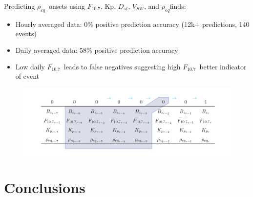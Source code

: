 \documentclass[xcolor={dvipsnames,table}]{beamer}
\newcommand{\req}{\ensuremath{\rho_{eq}}} %
\newcommand{\dst}{\ensuremath{D_{st}}} %
\newcommand{\f}{\ensuremath{F_{10.7}}} %
\begin{document}
\begin{frame}
	Predicting \req\ onsets using \f, Kp, \dst, $V_{SW}$, and \req finds:
	\begin{itemize}
		\item Hourly averaged data: 0\% positive prediction accuracy (12k+ predictions, 140 events)\\
		\item Daily averaged data: 58\% positive prediction accuracy\\
		\item Low daily \f\ leads to false negatives suggesting high \f\ better indicator of event
	\end{itemize}
	
		\begin{figure}[htp!]
			\centering
			\includegraphics[width=1\linewidth]{Figures/CH5/FullGraphic-2.png}
		\end{figure}
\end{frame}



\section{Conclusions}
\end{document}
